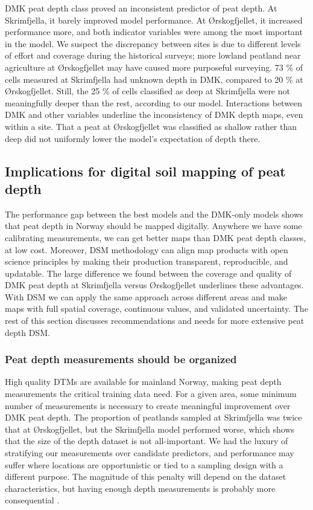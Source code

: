\documentclass[soil, manuscript]{copernicus}
\begin{document}
DMK peat depth class proved an inconsistent predictor of peat depth.
At Skrimfjella, it barely improved model performance.
At Ørskogfjellet, it increased performance more, and both indicator variables were among the most important in the model.
We suspect the discrepancy between sites is due to different levels of effort and coverage during the historical surveys; more lowland peatland near agriculture at Ørskogfjellet may have caused more purposeful surveying.
73 \% of cells measured at Skrimfjella had unknown depth in DMK, compared to 20 \% at Ørskogfjellet.
Still, the 25 \% of cells classified as deep at Skrimfjella were not meaningfully deeper than the rest, according to our model.
Interactions between DMK and other variables underline the inconsistency of DMK depth maps, even within a site.
That a peat at Ørskogfjellet was classified as shallow rather than deep did not uniformly lower the model's expectation of depth there.

\subsection{Implications for digital soil mapping of peat depth}

The performance gap between the best models and the DMK-only models shows that peat depth in Norway should be mapped digitally.
Anywhere we have some calibrating measurements, we can get better maps than DMK peat depth classes, at low cost.
Moreover, DSM methodology can align map products with open science principles by making their production transparent, reproducible, and updatable.
The large difference we found between the coverage and quality of DMK peat depth at Skrimfjella versus Ørskogfjellet underlines these advantages.
With DSM we can apply the same approach across different areas and make maps with full spatial coverage, continuous values, and validated uncertainty.
The rest of this section discusses recommendations and needs for more extensive peat depth DSM.

\subsubsection{Peat depth measurements should be organized}

High quality DTMs are available for mainland Norway, making peat depth measurements the critical training data need.
For a given area, some minimum number of measurements is necessary to create meaningful improvement over DMK peat depth.
The proportion of peatlands sampled at Skrimfjella was twice that at Ørskogfjellet, but the Skrimfjella model performed worse, which shows that the size of the depth dataset is not all-important.
We had the luxury of stratifying our measurements over candidate predictors, and performance may suffer where locations are opportunistic or tied to a sampling design with a different purpose.
The magnitude of this penalty will depend on the dataset characteristics, but having enough depth measurements is probably more consequential \citep{wadouxSamplingDesignOptimization2019}.
\end{document}
